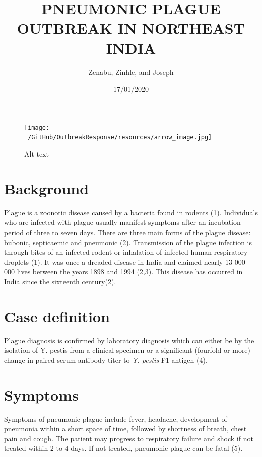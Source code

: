\documentclass[
]{article}
\title{PNEUMONIC PLAGUE OUTBREAK IN NORTHEAST INDIA}
\author{Zenabu, Zinhle, and Joseph}
\date{17/01/2020}
\begin{document}
\maketitle

{
\setcounter{tocdepth}{2}
\tableofcontents
}
\newpage

\begin{figure}
\centering
\texttt{[image: ~/GitHub/OutbreakResponse/resources/arrow\_image.jpg]}
\caption{Alt text}
\end{figure}

\hypertarget{background}{%
\section{Background}\label{background}}

Plague is a zoonotic disease caused by a bacteria found in rodents (1).
Individuals who are infected with plague usually manifest symptoms after
an incubation period of three to seven days. There are three main forms
of the plague disease: bubonic, septicaemic and pneumonic (2).
Transmission of the plague infection is through bites of an infected
rodent or inhalation of infected human respiratory droplets (1). It was
once a dreaded disease in India and claimed nearly 13 000 000 lives
between the years 1898 and 1994 (2,3). This disease has occurred in
India since the sixteenth century(2).

\hypertarget{case-definition}{%
\section{Case definition}\label{case-definition}}

Plague diagnosis is confirmed by laboratory diagnosis which can either
be by the isolation of Y. pestis from a clinical specimen or a
significant (fourfold or more) change in paired serum antibody titer to
\emph{Y. pestis} F1 antigen (4).

\hypertarget{symptoms}{%
\section{Symptoms}\label{symptoms}}

Symptoms of pneumonic plague include fever, headache, development of
pneumonia within a short space of time, followed by shortness of breath,
chest pain and cough. The patient may progress to respiratory failure
and shock if not treated within 2 to 4 days. If not treated, pneumonic
plague can be fatal (5).
\end{document}
